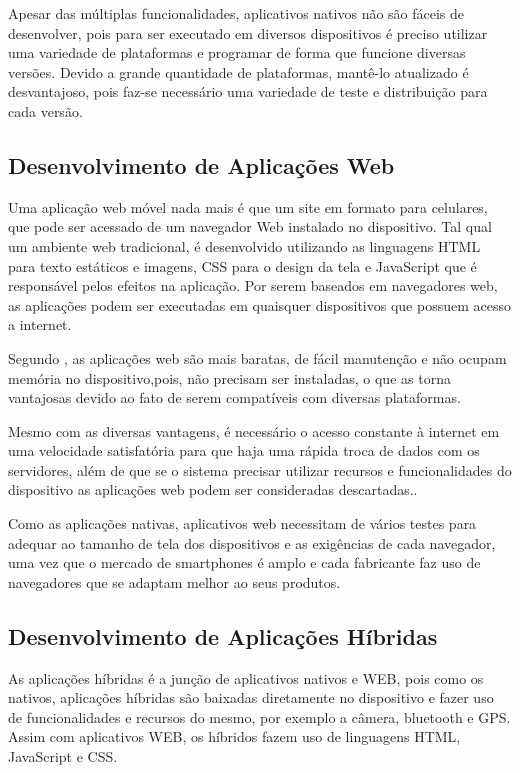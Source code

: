 Apesar das múltiplas funcionalidades, aplicativos nativos não são fáceis de desenvolver, pois para ser executado em diversos dispositivos é preciso utilizar uma variedade de plataformas e programar de forma que funcione diversas versões. Devido a grande quantidade de plataformas, mantê-lo atualizado é desvantajoso, pois faz-se necessário uma variedade de teste e distribuição para cada versão.

\subsection{Desenvolvimento de Aplicações Web}

Uma aplicação web móvel nada mais é que um site em formato para celulares, que pode ser acessado de um navegador Web instalado no dispositivo. Tal qual um ambiente web tradicional, é desenvolvido utilizando as linguagens HTML para texto estáticos e imagens, CSS para o design da tela e JavaScript que é responsável pelos efeitos na aplicação. Por serem baseados em navegadores web, as aplicações podem ser executadas em quaisquer dispositivos que possuem acesso a internet.\cite{emdesafios}

Segundo , as aplicações web são mais baratas, de fácil manutenção e não ocupam memória no dispositivo,pois, não precisam ser instaladas, o que as torna vantajosas devido ao fato de serem compatíveis com diversas plataformas.

Mesmo com as diversas vantagens, é necessário o acesso constante à internet em uma velocidade satisfatória para que haja uma rápida troca de dados com os servidores, além de que se o sistema precisar utilizar recursos e funcionalidades do dispositivo as aplicações web podem ser consideradas descartadas.\cite{toledo2016desenvolvimento}.

Como as aplicações nativas, aplicativos web necessitam de vários testes para adequar ao tamanho de tela dos dispositivos e as exigências de cada navegador, uma vez que o mercado de smartphones é amplo e cada fabricante faz uso de navegadores que se adaptam melhor ao seus produtos.

\subsection{Desenvolvimento de Aplicações Híbridas}

As  aplicações híbridas é a junção de aplicativos nativos e WEB, pois como os nativos, aplicações híbridas são baixadas diretamente no dispositivo e fazer uso de funcionalidades e recursos do mesmo, por exemplo a câmera, bluetooth e GPS. Assim com aplicativos WEB, os híbridos fazem uso de linguagens HTML, JavaScript e CSS. \cite{tavares2016introduccao}

